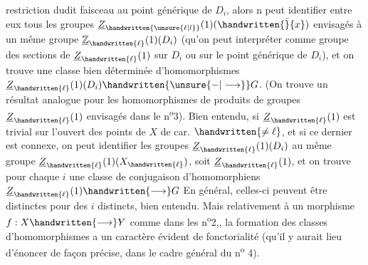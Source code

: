 
restriction dudit faisceau au  point générique de $D_i$, alors n peut identifier entre eux tous les groupes $\underline{Z}_{\handwritten{\unsure{\ell|l}}}(1)(\handwritten{\bar}{x})$ envisagés à un même groupe $\underline{\mathbb{Z}}_{\handwritten{\ell}}(1)(D_i)$ (qu'on peut interpréter comme groupe des sections de $\underline{Z}_{\handwritten{\ell}}(1)$ sur $D_i$ ou sur le point générique de $D_i$), et on trouve une classe  bien déterminée d'homomorphismes $\underline{Z}_{\handwritten{\ell}}(1)(D_i)\handwritten{\unsure{\mathbin{-}|\longrightarrow}}G$. (On trouve un résultat analogue pour les homomorphismes de produits de groupes $\underline{Z}_{\handwritten{\ell}}(1)$ envisagés dans le n\textsuperscript{o}3). Bien entendu, si $\underline{Z}_{\handwritten{\ell}}(1)$ est trivial sur l'ouvert des points de $X$  de car. $\handwritten{\ne\ell}$, et si ce dernier est connexe, on peut identifier les groupes $\underline{Z}_{\handwritten{\ell}}(1)(D_i)$ au même groupe  $\underline{Z}_{\handwritten{\ell}}(1)(X_{\handwritten{\ell}})$,  soit $\underline{Z}_{\handwritten{\ell}}(1)$, et on trouve  pour chaque $i$ une classe de conjugaison d'homomorphiens $\underline{Z}_{\handwritten{\ell}}(1)\handwritten{\longrightarrow}G$ En général, celles-ci  peuvent être distinctes pour des $i$ distincts, bien entendu. Mais relativement à un morphisme $f:X\handwritten{\longrightarrow}Y$ comme dans les n\textsuperscript{o}2,, la formation des classes  d'homomorphismes a un caractère évident de fonctorialité (qu'il y aurait lieu d'énoncer de façon précise, dans le cadre général du n\textsuperscript{o} 4).


